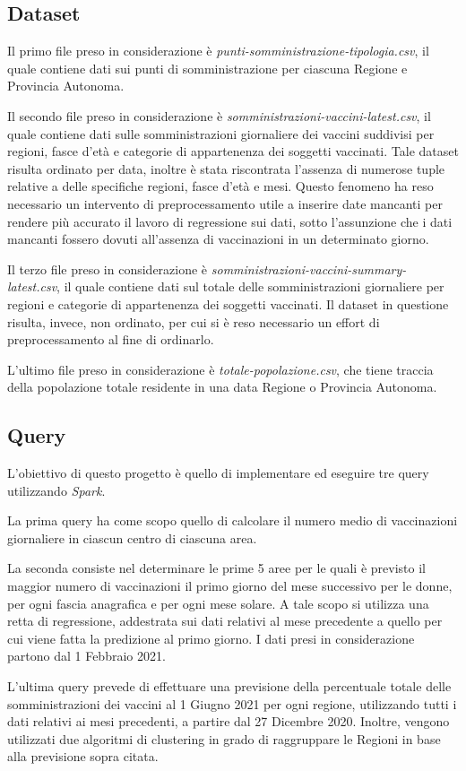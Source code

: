 \documentclass[conference]{IEEEtran}
\begin{document}
\subsection*{\textbf{Dataset}} 
Il primo file preso in considerazione \`{e} \textit{punti-somministrazione-tipologia.csv}, il quale contiene dati sui punti di somministrazione per ciascuna Regione e Provincia Autonoma.
\par Il secondo file preso in considerazione \`{e} \textit{somministrazioni-vaccini-latest.csv}, il quale contiene dati sulle somministrazioni giornaliere dei vaccini suddivisi per regioni, fasce d'et\`{a} e categorie di appartenenza dei soggetti vaccinati. Tale dataset risulta ordinato per data,
inoltre \`{e} stata riscontrata l'assenza di numerose tuple relative a delle specifiche regioni, fasce d'et\`{a} e mesi. Questo fenomeno ha reso necessario un intervento di preprocessamento utile a inserire date mancanti per rendere pi\`{u} accurato il lavoro di regressione sui dati, sotto l'assunzione che i dati mancanti fossero dovuti all'assenza di vaccinazioni in un determinato giorno. 
\par Il terzo file preso in considerazione \`{e} \textit{somministrazioni-vaccini-summary-latest.csv}, il quale contiene dati sul totale delle somministrazioni giornaliere per regioni e categorie di appartenenza dei soggetti vaccinati. Il dataset in questione risulta, invece, non ordinato, per cui
si \`{e} reso necessario un effort di preprocessamento al fine di ordinarlo. 
\par L'ultimo file preso in considerazione \`{e} \textit{totale-popolazione.csv}, che tiene traccia
della popolazione totale residente in una data Regione o Provincia Autonoma.
\subsection*{\textbf{Query}}
L'obiettivo di questo progetto \`{e} quello di implementare ed eseguire tre query utilizzando \emph{Spark}.
\par La prima query ha come scopo quello di calcolare il numero medio di vaccinazioni giornaliere
in ciascun centro di ciascuna area.
\par La seconda consiste nel determinare le prime 5 aree per le quali è previsto il maggior numero di
vaccinazioni il primo giorno del mese successivo per le donne, per ogni fascia anagrafica e per ogni mese solare. A tale scopo si utilizza una retta di regressione, addestrata sui dati relativi al mese
precedente a quello per cui viene fatta la predizione al primo giorno. I dati presi in considerazione partono dal 1 Febbraio 2021.
\par L'ultima query prevede di effettuare una previsione della percentuale totale delle somministrazioni dei vaccini al 1 Giugno 2021 per ogni regione, utilizzando tutti i dati relativi ai mesi precedenti, a partire dal 27 Dicembre 2020. Inoltre, vengono utilizzati due algoritmi di
clustering in grado di raggruppare le Regioni in base alla previsione sopra citata.
\end{document}
